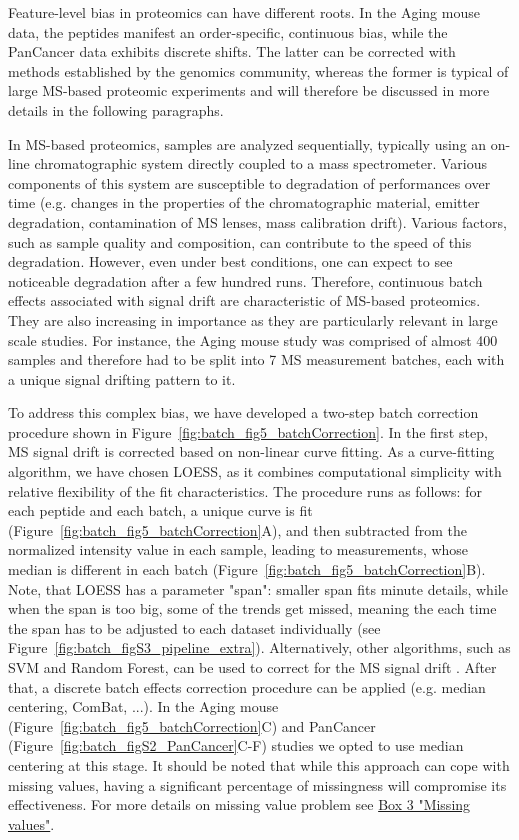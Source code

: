 \documentclass[num-refs]{wiley-article}
\begin{document}
Feature-level bias in proteomics can have different  roots. In the Aging mouse data, the peptides manifest an order-specific, continuous bias, while the PanCancer data exhibits discrete shifts. The latter can be corrected with methods established by the genomics community, whereas the former is typical of large MS-based proteomic experiments and will therefore be discussed in more details in the following paragraphs.

In MS-based proteomics, samples are analyzed sequentially, typically using an on-line chromatographic system directly coupled to a mass spectrometer. Various components of this system are susceptible to degradation of performances over time (e.g. changes in the properties of the chromatographic material, emitter degradation, contamination of MS lenses, mass calibration drift). Various factors, such as sample quality and composition, can contribute to the speed of this degradation. However, even under best conditions, one can expect to see noticeable degradation after a few hundred runs. Therefore, continuous batch effects associated with signal drift are characteristic of MS-based proteomics. They are also increasing in importance as they are particularly relevant in large scale studies. For instance, the Aging mouse study was comprised of almost 400 samples and therefore had to be split into 7 MS measurement batches, each with a unique signal drifting pattern to it.

To address this complex bias, we have developed a two-step batch correction procedure shown in Figure~\ref{fig:batch_fig5_batchCorrection}. In the first step, MS signal drift is corrected based on non-linear curve fitting. As a curve-fitting algorithm, we have chosen LOESS, as it combines computational simplicity with relative flexibility of the fit characteristics. The procedure runs as follows: for each peptide and each batch, a unique curve is fit (Figure~\ref{fig:batch_fig5_batchCorrection}A), and then subtracted from the normalized intensity value in each sample, leading to measurements, whose median is different in each batch (Figure~\ref{fig:batch_fig5_batchCorrection}B). Note, that LOESS has a parameter "span": smaller span fits minute details, while when the span is too big, some of the trends get missed, meaning the each time the span has to be adjusted to each dataset individually (see Figure~\ref{fig:batch_figS3_pipeline_extra}). Alternatively, other algorithms, such as SVM and Random Forest, can be used to correct for the MS signal drift \cite{Luan2018, Shen2016}.   After that, a discrete batch effects correction procedure can be applied (e.g. median centering, ComBat, ...). In the Aging mouse (Figure~\ref{fig:batch_fig5_batchCorrection}C) and PanCancer (Figure~\ref{fig:batch_figS2_PanCancer}C-F) studies we opted to use median centering at this stage. It should be noted that while this approach can cope with missing values, having a significant percentage of missingness will compromise its effectiveness. For more details on missing value problem see \hyperref[box:Box3_missingness]{Box 3 "Missing values"}.
\end{document}
